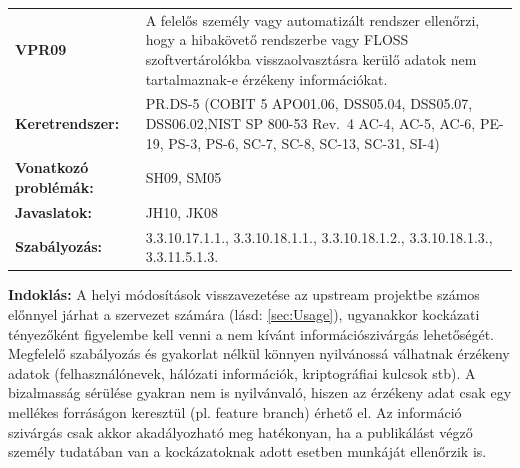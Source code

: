 \documentclass[12pt,magyar,a4paper,oneside]{scrreprt}
\begin{document}
\begin{longtable}[]{@{}ll@{}}
\toprule
\endhead
\begin{minipage}[t]{0.16\columnwidth}\raggedright
\textbf{VPR09}\strut
\end{minipage} & \begin{minipage}[t]{0.79\columnwidth}\raggedright
A felelős személy vagy automatizált rendszer ellenőrzi, hogy a
hibakövető rendszerbe vagy FLOSS szoftvertárolókba visszaolvasztásra
kerülő adatok nem tartalmaznak-e érzékeny információkat.\strut
\end{minipage}\tabularnewline
\begin{minipage}[t]{0.16\columnwidth}\raggedright
\textbf{Keretrendszer:}\strut
\end{minipage} & \begin{minipage}[t]{0.79\columnwidth}\raggedright
PR.DS-5 (COBIT 5 APO01.06, DSS05.04, DSS05.07, DSS06.02,NIST SP 800-53
Rev.~4 AC-4, AC-5, AC-6, PE-19, PS-3, PS-6, SC-7, SC-8, SC-13, SC-31,
SI-4)\strut
\end{minipage}\tabularnewline
\begin{minipage}[t]{0.16\columnwidth}\raggedright
\textbf{Vonatkozó problémák:}\strut
\end{minipage} & \begin{minipage}[t]{0.79\columnwidth}\raggedright
SH09, SM05\strut
\end{minipage}\tabularnewline
\begin{minipage}[t]{0.16\columnwidth}\raggedright
\textbf{Javaslatok:}\strut
\end{minipage} & \begin{minipage}[t]{0.79\columnwidth}\raggedright
JH10, JK08\strut
\end{minipage}\tabularnewline
\begin{minipage}[t]{0.16\columnwidth}\raggedright
\textbf{Szabályozás:}\strut
\end{minipage} & \begin{minipage}[t]{0.79\columnwidth}\raggedright
3.3.10.17.1.1., 3.3.10.18.1.1., 3.3.10.18.1.2., 3.3.10.18.1.3.,
3.3.11.5.1.3.\strut
\end{minipage}\tabularnewline
\bottomrule
\end{longtable}

\textbf{Indoklás: } A helyi módosítások visszavezetése az upstream
projektbe számos előnnyel járhat a szervezet számára (lásd:
\ref{sec:Usage}), ugyanakkor kockázati tényezőként figyelembe kell venni
a nem kívánt információszivárgás lehetőségét. Megfelelő szabályozás és
gyakorlat nélkül könnyen nyilvánossá válhatnak érzékeny adatok
(felhasználónevek, hálózati információk, kriptográfiai kulcsok stb). A
bizalmasság sérülése gyakran nem is nyilvánvaló, hiszen az érzékeny adat
csak egy mellékes forráságon keresztül (pl. feature branch) érhető el.
Az információ szivárgás csak akkor akadályozható meg hatékonyan, ha a
publikálást végző személy tudatában van a kockázatoknak adott esetben
munkáját ellenőrzik is.
\end{document}
